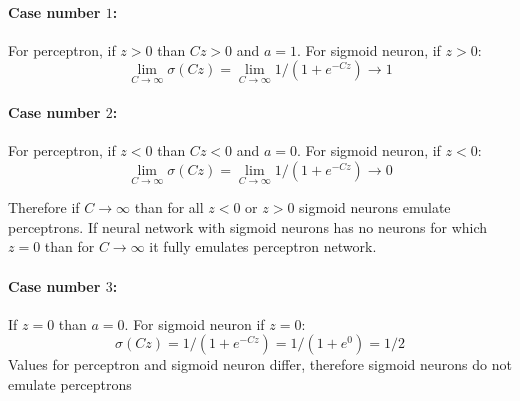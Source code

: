 \documentclass{article}
\begin{document}
\paragraph{Case number $1$:}
For perceptron, if $z > 0$ than $Cz > 0$ and $a = 1$. 
For sigmoid neuron, if $z > 0$:
$$\lim_{C \to \infty} \sigma(Cz) = \lim_{C \to \infty} 1/(1 + e^{-Cz}) \to 1$$

\paragraph{Case number $2$:}
For perceptron, if $z < 0$ than $Cz < 0$ and $a = 0$. 
For sigmoid neuron, if $z < 0$:
$$\lim_{C \to \infty} \sigma(Cz) = \lim_{C \to \infty} 1/(1 + e^{-Cz}) \to 0$$

Therefore if $C \to \infty$ than for all $z < 0$ or $z > 0$ sigmoid neurons emulate perceptrons.
If neural network with sigmoid neurons has no neurons for which $z = 0$ than for $C \to \infty$ it fully emulates perceptron network.

\paragraph{Case number $3$:}

If $z = 0$ than $a = 0$.
For sigmoid neuron if $z = 0$:
$$\sigma(Cz) = 1/(1 + e^{-Cz}) = 1/(1 + e^0) = 1/2$$
Values for perceptron and sigmoid neuron differ, therefore sigmoid neurons do not emulate perceptrons
\end{document}
